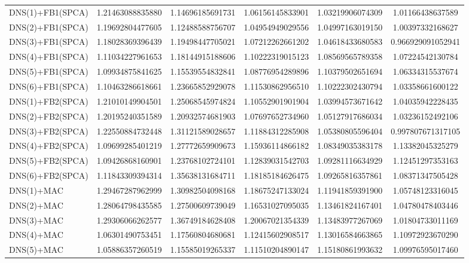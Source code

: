 \begin{table}[H]
\begin{adjustbox}{totalheight=\baselineskip}
\begin{tabular}{lSSSSS}
DNS(1)+FB1(SPCA) & 1.21463088835880 & 1.14696185691731 & 1.06156145833901 & 1.03219906074309 & 1.01166438637589 \\ 
DNS(2)+FB1(SPCA) & 1.19692804477605 & 1.12488588756707 & 1.04954949029556 & 1.04997163019150 & 1.00397332168627 \\ 
DNS(3)+FB1(SPCA) & 1.18028369396439 & 1.19498447705021 & 1.07212262661202 & 1.04618433680583 & 0.966929091052941 \\ 
DNS(4)+FB1(SPCA) & 1.11034227961653 & 1.18144915188606 & 1.10222319015123 & 1.08569565789358 & 1.07224542130784 \\ 
DNS(5)+FB1(SPCA) & 1.09934875841625 & 1.15539554832841 & 1.08776954289896 & 1.10379502651694 & 1.06334315537674 \\ 
DNS(6)+FB1(SPCA) & 1.10463286618661 & 1.23665852929078 & 1.11530862956510 & 1.10222302430794 & 1.03358661600122 \\ 
DNS(1)+FB2(SPCA) & 1.21010149904501 & 1.25068545974824 & 1.10552901901904 & 1.03994573671642 & 1.04035942228435 \\ 
DNS(2)+FB2(SPCA) & 1.20195240351589 & 1.20932574681903 & 1.07697652734960 & 1.05127917686034 & 1.03236152492106 \\ 
DNS(3)+FB2(SPCA) & 1.22550884732448 & 1.31121589028657 & 1.11884312285908 & 1.05380805596404 & 0.997807671317105 \\ 
DNS(4)+FB2(SPCA) & 1.09699285401219 & 1.27772659909673 & 1.15936114866182 & 1.08349035383178 & 1.13382045325279 \\ 
DNS(5)+FB2(SPCA) & 1.09426868160901 & 1.23768102724101 & 1.12839031542703 & 1.09281116634929 & 1.12451297353163 \\ 
DNS(6)+FB2(SPCA) & 1.11843309394314 & 1.35638131684711 & 1.18185184626475 & 1.09265816357861 & 1.08371347505428 \\ 
DNS(1)+MAC & 1.29467287962999 & 1.30982504098168 & 1.18675247133024 & 1.11941859391900 & 1.05748123316045 \\ 
DNS(2)+MAC & 1.28064798435585 & 1.27500609739049 & 1.16531027095035 & 1.13461824167401 & 1.04780478403446 \\ 
DNS(3)+MAC & 1.29306066262577 & 1.36749184628408 & 1.20067021354339 & 1.13483977267069 & 1.01804733011169 \\ 
DNS(4)+MAC & 1.06301490753451 & 1.17560804680681 & 1.12415602908517 & 1.13016584663865 & 1.10972923670290 \\ 
DNS(5)+MAC & 1.05886357260519 & 1.15585019265337 & 1.11510204890147 & 1.15180861993632 & 1.09976595017460 \\ 

\end{tabular}
\end{adjustbox}
\end{table}
